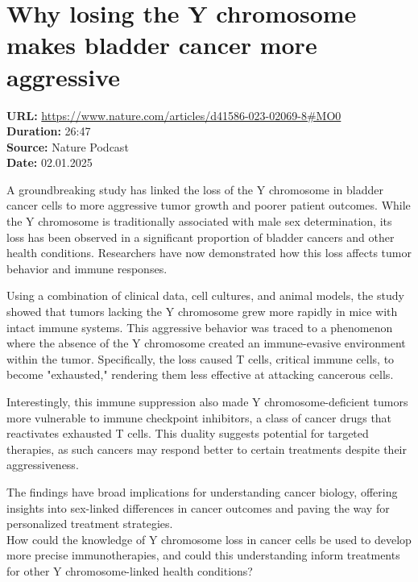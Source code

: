\documentclass[12pt]{article}
\begin{document}
\newpage

\section{Why losing the Y chromosome makes bladder cancer more aggressive}
\textbf{URL:} \url{https://www.nature.com/articles/d41586-023-02069-8#MO0}\\
\textbf{Duration:} 26:47\\
\textbf{Source:} Nature Podcast\\
\textbf{Date:} 02.01.2025
 

A groundbreaking study has linked the loss of the Y chromosome in bladder cancer cells to more aggressive tumor growth and poorer patient outcomes. While the Y chromosome is traditionally associated with male sex determination, its loss has been observed in a significant proportion of bladder cancers and other health conditions. Researchers have now demonstrated how this loss affects tumor behavior and immune responses.  

Using a combination of clinical data, cell cultures, and animal models, the study showed that tumors lacking the Y chromosome grew more rapidly in mice with intact immune systems. This aggressive behavior was traced to a phenomenon where the absence of the Y chromosome created an immune-evasive environment within the tumor. Specifically, the loss caused T cells, critical immune cells, to become "exhausted," rendering them less effective at attacking cancerous cells.  

Interestingly, this immune suppression also made Y chromosome-deficient tumors more vulnerable to immune checkpoint inhibitors, a class of cancer drugs that reactivates exhausted T cells. This duality suggests potential for targeted therapies, as such cancers may respond better to certain treatments despite their aggressiveness.  

The findings have broad implications for understanding cancer biology, offering insights into sex-linked differences in cancer outcomes and paving the way for personalized treatment strategies.\\[5px]  
 
How could the knowledge of Y chromosome loss in cancer cells be used to develop more precise immunotherapies, and could this understanding inform treatments for other Y chromosome-linked health conditions?  




\newpage
\end{document}
